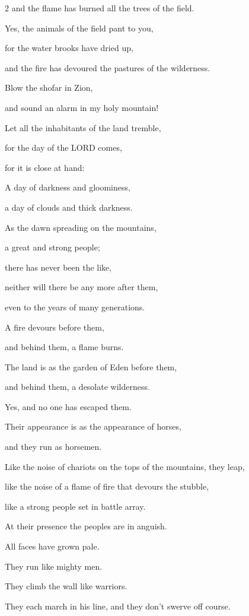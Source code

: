 \begin{multicols}{2}
and the flame has burned all the trees of the field.

\myverse{}Yes, the animals of the field pant to you,

for the water brooks have dried up,

and the fire has devoured the pastures of the wilderness.


\mychapter{} \myverse*{}Blow the shofar in Zion,

and sound an alarm in my holy mountain!

Let all the inhabitants of the land tremble,

for the day of the LORD comes,

for it is close at hand:

\myverse{}A day of darkness and gloominess,

a day of clouds and thick darkness.

As the dawn spreading on the mountains,

a great and strong people;

there has never been the like,

neither will there be any more after them,

even to the years of many generations.

\myverse{}A fire devours before them,

and behind them, a flame burns.

The land is as the garden of Eden before them,

and behind them, a desolate wilderness.

Yes, and no one has escaped them.

\myverse{}Their appearance is as the appearance of horses,

and they run as horsemen.

\myverse{}Like the noise of chariots on the tops of the mountains, they
leap,

like the noise of a flame of fire that devours the stubble,

like a strong people set in battle array.

\myverse{}At their presence the peoples are in anguish.

All faces have grown pale.

\myverse{}They run like mighty men.

They climb the wall like warriors.

They each march in his line, and they don’t swerve off course.


\end{multicols}
